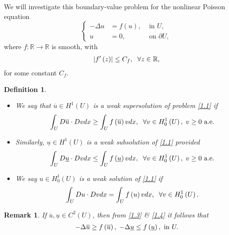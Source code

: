 \documentclass[11pt,a4paper,center,notitlepage]{article}
\numberwithin{equation}{section}
\newtheorem{definition}{Definition}[section]
\newtheorem{remark}{Remark}[section]
\begin{document}
We will investigate this boundary-value problem for the nonlinear Poisson equation
\begin{equation}
\label{1.1}
\left\{ \begin{split}
 - \Delta u &= f\left( u \right), & \mbox{ in } U,\\
u &= 0, & \mbox{ on } \partial U,
\end{split} \right.
\end{equation}
where $f:\mathbb{R}\to \mathbb{R}$ is smooth, with 
\begin{align}
\label{1.2}
\left| {f'\left( z \right)} \right| \le C_f, \hspace{2mm}\forall z \in \mathbb{R},
\end{align}
for some constant $C_f$.
\begin{definition}
\begin{itemize}
\item[(i)] We say that $\overline{u} \in H^1\left(U\right)$ is a \emph{weak supersolution} of problem \eqref{1.1} if 
\begin{align}
\label{1.3}
\int_U {D\overline u  \cdot Dvdx}  \ge \int_U {f\left( {\overline u } \right)vdx} ,\hspace{2mm}\forall v \in H_0^1\left( U \right),\hspace{1mm}v \ge 0 \mbox{ a.e.}
\end{align}
\item[(ii)] Similarly, $\underline{u} \in H^1\left(U\right)$ is a \emph{weak subsolution} of \eqref{1.1} provided
\begin{align}
\label{1.4}
\int_U {D\underline u  \cdot Dvdx}  \le \int_U {f\left( {\underline u } \right)vdx} ,\hspace{2mm}\forall v \in H_0^1\left( U \right),\hspace{1mm} v \ge 0 \mbox{ a.e.}
\end{align}
\item[(iii)] We say $u\in H_0^1\left(U\right)$ is a \emph{weak solution} of \eqref{1.1} if
\begin{align}
\int_U {Du \cdot Dvdx}  = \int_U {f\left( u \right)vdx} ,\hspace{2mm} \forall v \in H_0^1\left( U \right).
\end{align}
\end{itemize}
\end{definition}

\begin{remark}\label{remark1.1}
If $\overline{u}, \underline{u} \in C^2\left(U\right)$, then from \eqref{1.3} \& \eqref{1.4} it follows that
\begin{align}
\label{1.6}
 - \Delta \overline u  \ge f\left( {\overline u } \right),\hspace{1mm} - \Delta \underline u  \le f\left( {\underline u } \right), \mbox{ in } U.
\end{align}
\end{remark}
\end{document}
